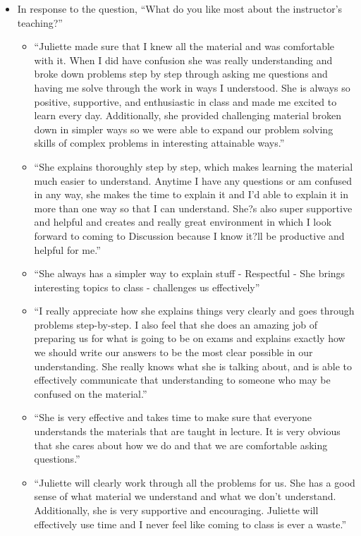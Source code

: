 \documentclass[letterpaper,11pt]{article}
\begin{document}
\begin{itemize}
\item In response to the question, ``What do you like most about the instructor's teaching?''
	\begin{itemize}
		\item ``Juliette made sure that I knew all the material and was comfortable with it. When I did have confusion she was really understanding and broke down problems step by step through asking me questions and having me solve through the work in ways I understood. She is always so positive, supportive, and enthusiastic in class and made me excited to learn every day. Additionally, she provided challenging material broken down in simpler ways so we were able to expand our problem solving skills of complex problems in interesting attainable ways.''
		\item ``She explains thoroughly step by step, which makes learning the material much easier to understand. Anytime I have any questions or am confused in any way, she makes the time to explain it and I'd able to explain it in more than one way so that I can understand. She?s also super supportive and helpful and creates and really great environment in which I look forward to coming to Discussion because I know it?ll be productive and helpful for me.''
		\item ``She always has a simpler way to explain stuff - Respectful - She brings interesting topics to class - challenges us effectively''
		\item ``I really appreciate how she explains things very clearly and goes through problems step-by-step. I also feel that she does an amazing job of preparing us for what is going to be on exams and explains exactly how we should write our answers to be the most clear possible in our understanding. She really knows what she is talking about, and is able to effectively communicate that understanding to someone who may be confused on the material.''
		\item ``She is very effective and takes time to make sure that everyone understands the materials that are taught in lecture. It is very obvious that she cares about how we do and that we are comfortable asking questions.''
		\item ``Juliette will clearly work through all the problems for us. She has a good sense of what material we understand and what we don't understand. Additionally, she is very supportive and encouraging. Juliette will effectively use time and I never feel like coming to class is ever a waste.''
	\end{itemize}
	

\end{itemize}
\end{document}
